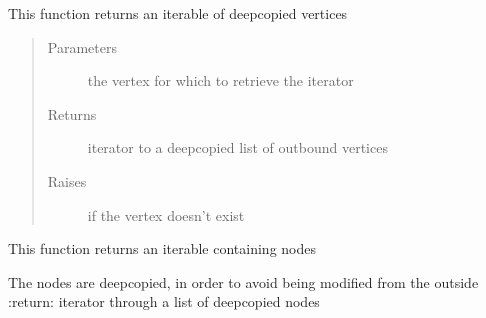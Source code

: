 \documentclass[letterpaper,10pt,english]{sphinxmanual}
\begin{document}
\begin{fulllineitems}
\begin{fulllineitems}
\begin{quote}
\begin{description}
\end{description}\end{quote}

\end{fulllineitems}


\begin{fulllineitems}
\label{\detokenize{UndirectedGraph:UndirectedGraph.UndirectedGraph.parse_adjacent_edges}}
This function returns an iterable of deepcopied vertices
\begin{quote}\begin{description}
\item[{Parameters}] \leavevmode
{} \textendash{} the vertex for which to retrieve the iterator

\item[{Returns}] \leavevmode
iterator to a deepcopied list of outbound vertices

\item[{Raises}] \leavevmode
{} \textendash{} if the vertex doesn’t exist

\end{description}\end{quote}

\end{fulllineitems}


\begin{fulllineitems}
\label{\detokenize{UndirectedGraph:UndirectedGraph.UndirectedGraph.parse_vertices}}
This function returns an iterable containing nodes

The nodes are deepcopied, in order to avoid being modified from the outside
:return: iterator through a list of deepcopied nodes

\end{fulllineitems}



\end{fulllineitems}
\end{document}
